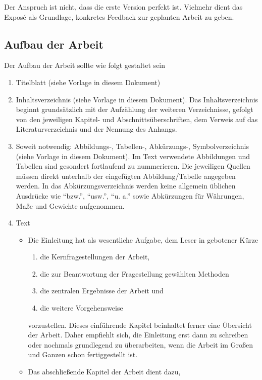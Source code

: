 \documentclass[a4paper,12pt]{scrartcl} %
\begin{document}
Der Anspruch ist nicht, dass die erste Version perfekt ist. Vielmehr dient das Exposé als Grundlage, konkretes Feedback zur geplanten Arbeit zu geben.

\subsection{Aufbau der Arbeit}\label{subsec:aufbau}
Der Aufbau der Arbeit sollte wie folgt gestaltet sein
\begin{enumerate}
\item Titelblatt (siehe Vorlage in diesem Dokument)
\item Inhaltsverzeichnis (siehe Vorlage in diesem Dokument). Das Inhaltsverzeichnis beginnt grundsätzlich mit der Aufzählung der weiteren Verzeichnisse, gefolgt von den jeweiligen Kapitel- und Abschnittsüberschriften, dem Verweis auf das Literaturverzeichnis und der Nennung des Anhangs.
\item Soweit notwendig: Abbildungs-, Tabellen-, Abkürzungs-, Symbolverzeichnis (siehe Vorlage in diesem Dokument). Im Text verwendete Abbildungen und Tabellen sind gesondert fortlaufend zu nummerieren. Die jeweiligen Quellen müssen direkt unterhalb der eingefügten Abbildung/Tabelle angegeben werden. In das Abkürzungsverzeichnis werden keine allgemein üblichen Ausdrücke wie ``bzw.'', ``usw.'', ``u. a.'' sowie Abkürzungen für Währungen, Maße und Gewichte aufgenommen.
\item Text
	\begin{itemize}
	\item Die Einleitung hat als wesentliche Aufgabe, dem Leser in gebotener Kürze
    \begin{enumerate}[label=\roman*.]
        \item die Kernfragestellungen der Arbeit,
        \item die zur Beantwortung der Fragestellung gewählten Methoden
        \item die zentralen Ergebnisse der Arbeit und
        \item die weitere Vorgehensweise
    \end{enumerate}
    vorzustellen. Dieses einführende Kapitel beinhaltet ferner eine
    Übersicht der Arbeit. Daher empfiehlt sich, die Einleitung erst dann zu
    schreiben oder nochmals grundlegend zu überarbeiten, wenn die Arbeit im Großen und Ganzen schon fertiggestellt ist.
	\item Das abschließende Kapitel der Arbeit dient dazu,
    \begin{enumerate}[label=\roman*.]

\end{enumerate}
\end{itemize}
\end{enumerate}
\end{document}

